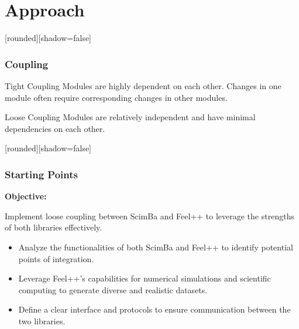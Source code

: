 \documentclass[10pt]{beamer}
\begin{document}

\section{Approach}

\begin{frame}
[rounded][shadow=false]
\frametitle{Coupling}
\begin{block}{Tight Coupling}
Modules are highly dependent on each other. Changes in one module often require corresponding changes in other modules.

\end{block}

\begin{block}{Loose Coupling}
Modules are relatively independent and have minimal dependencies on each other.


\end{block}
\end{frame}



\begin{frame}
[rounded][shadow=false]
\frametitle{Starting Points}

\textbf{Objective:}

Implement loose coupling between ScimBa and Feel++ to leverage the strengths of both libraries effectively.



 \begin{itemize}
        \item Analyze the functionalities of both ScimBa and Feel++ to identify potential points of integration. 
        



        \item Leverage Feel++'s capabilities for numerical simulations and scientific computing to generate diverse and realistic datasets. 
        

        \item Define a clear interface and protocols to ensure communication between the two libraries. 
        
        
        
    \end{itemize}   

\end{frame}
\end{document}
